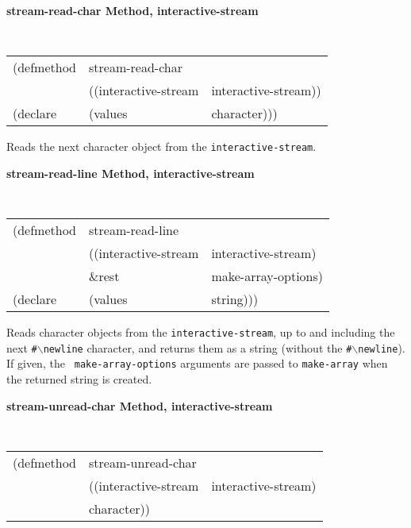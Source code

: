 {\samepage
{\large {\bf stream-read-char \hfill Method, interactive-stream}}
\begin{flushright} \parbox[t]{6.125in}{
\tt
\begin{tabular}{lll}
\raggedright
(defmethod & stream-read-char & \\
& ((interactive-stream  &interactive-stream))\\
(declare &(values &character)))
\end{tabular}
\rm

}\end{flushright}}

\begin{flushright} \parbox[t]{6.125in}{
Reads the next character object from the {\tt interactive-stream}.

}\end{flushright}

{\samepage
{\large {\bf stream-read-line \hfill Method, interactive-stream}}
\begin{flushright} \parbox[t]{6.125in}{
\tt
\begin{tabular}{lll}
\raggedright
(defmethod & stream-read-line & \\
& ((interactive-stream  &interactive-stream)\\
& \&rest & make-array-options)\\
(declare &(values &string)))
\end{tabular}
\rm

}\end{flushright}}

\begin{flushright} \parbox[t]{6.125in}{
Reads character objects from the {\tt interactive-stream}, up to and including the
next {\tt \#$\backslash$newline} character, and returns them as a string
(without the {\tt \#$\backslash$newline}). If given, the {\tt
make-array-options} arguments are passed to {\tt make-array} when
the returned string is created.

}\end{flushright}


{\samepage
{\large {\bf stream-unread-char \hfill Method, interactive-stream}}
\begin{flushright} \parbox[t]{6.125in}{
\tt
\begin{tabular}{lll}
\raggedright
(defmethod & stream-unread-char & \\
& ((interactive-stream  &interactive-stream)\\
& character))
\end{tabular}
\rm

}\end{flushright}}

